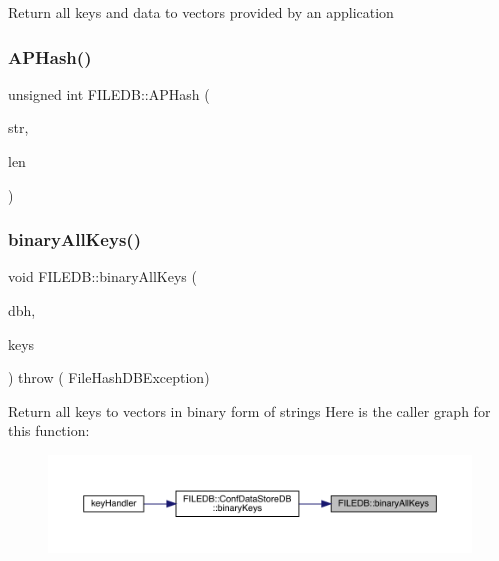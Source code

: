 Return all keys and data to vectors provided by an application \mbox{\label{namespaceFILEDB_a23c71972866e86f222ad440284380f45}} 
\subsubsection{\texorpdfstring{APHash()}{APHash()}}
{\footnotesize\ttfamily unsigned int F\+I\+L\+E\+D\+B\+::\+A\+P\+Hash (\begin{DoxyParamCaption}\item[{char $\ast$}]{str,  }\item[{unsigned int}]{len }\end{DoxyParamCaption})}

\mbox{\label{namespaceFILEDB_a208d694e308a85bd3b04277ffe369377}} 
\subsubsection{\texorpdfstring{binaryAllKeys()}{binaryAllKeys()}}
{\footnotesize\ttfamily void F\+I\+L\+E\+D\+B\+::binary\+All\+Keys (\begin{DoxyParamCaption}\item[{\mbox{\hyperlink{adat-devel_2other__libs_2filedb_2filehash_2ffdb__db_8h_a0b27b956926453a7a8141ea8e10f0df8}{F\+F\+D\+B\+\_\+\+DB}} $\ast$}]{dbh,  }\item[{std\+::vector$<$ std\+::string $>$ \&}]{keys }\end{DoxyParamCaption}) throw ( File\+Hash\+D\+B\+Exception) }

Return all keys to vectors in binary form of strings Here is the caller graph for this function\+:
\nopagebreak
\begin{figure}[H]
\begin{center}
\leavevmode
\includegraphics[width=350pt]{d2/de6/namespaceFILEDB_a208d694e308a85bd3b04277ffe369377_icgraph}
\end{center}
\end{figure}
\mbox{\label{namespaceFILEDB_ac242fd8f47258576482a692de8d1eaf3}} 
